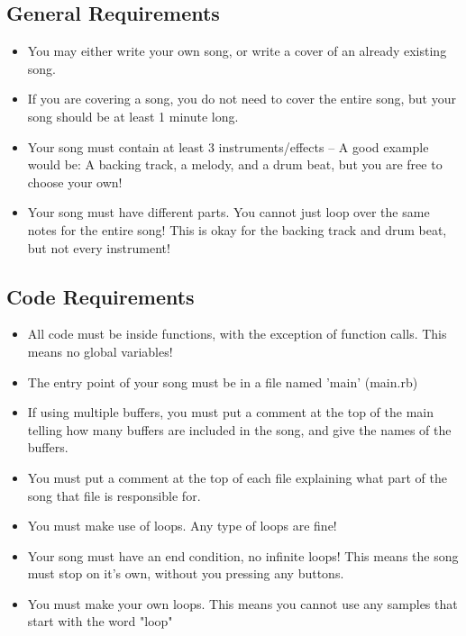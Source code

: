 \documentclass{42-en}
\begin{document}
	\subsection{General Requirements}
		\begin{itemize}\itemsep1pt
			\item You may either write your own song, or write a cover of an already existing song.
			\item If you are covering a song, you do not need to cover the entire song, but your song should be at least 1 minute long.
			\item Your song must contain at least 3 instruments/effects -- A good example would be:  A backing track, a melody, and a drum beat, but you are free to choose your own!
			\item Your song must have different parts. You cannot just loop over the same notes for the entire song! This is okay for the backing track and drum beat, but not every instrument!
		\end{itemize}

	\subsection{Code Requirements}
		\begin{itemize}\itemsep1pt
			\item All code must be inside functions, with the exception of function calls. This means no global variables!
			\item The entry point of your song must be in a file named 'main' (main.rb)
			\item If using multiple buffers, you must put a comment at the top of the main telling how many buffers are included in the song, and give the names of the buffers.
			\item You must put a comment at the top of each file explaining what part of the song that file is responsible for.
			\item You must make use of loops. Any type of loops are fine!
			\item Your song must have an end condition, no infinite loops! This means the song must stop on it's own, without you pressing any buttons.
			\item You must make your own loops. This means you cannot use any samples that start with the word "loop"
		\end{itemize}
\end{document}
